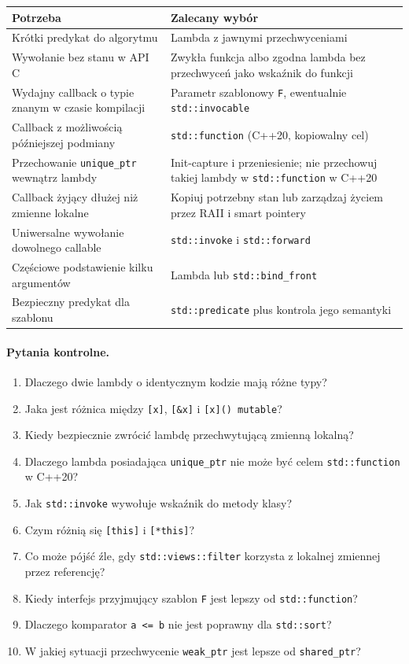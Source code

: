 \begin{center}
\begin{tabular}{|p{5.7cm}|p{6.6cm}|}
\hline
\textbf{Potrzeba} & \textbf{Zalecany wybór} \\
\hline
Krótki predykat do algorytmu & Lambda z jawnymi przechwyceniami \\
\hline
Wywołanie bez stanu w API C & Zwykła funkcja albo zgodna lambda bez przechwyceń jako wskaźnik do funkcji \\
\hline
Wydajny callback o typie znanym w czasie kompilacji & Parametr szablonowy \texttt{F}, ewentualnie \texttt{std::invocable} \\
\hline
Callback z możliwością późniejszej podmiany & \texttt{std::function} (C++20, kopiowalny cel) \\
\hline
Przechowanie \texttt{unique\_ptr} wewnątrz lambdy & Init-capture i przeniesienie; nie przechowuj takiej lambdy w \texttt{std::function} w C++20 \\
\hline
Callback żyjący dłużej niż zmienne lokalne & Kopiuj potrzebny stan lub zarządzaj życiem przez RAII i smart pointery \\
\hline
Uniwersalne wywołanie dowolnego callable & \texttt{std::invoke} i \texttt{std::forward} \\
\hline
Częściowe podstawienie kilku argumentów & Lambda lub \texttt{std::bind\_front} \\
\hline
Bezpieczny predykat dla szablonu & \texttt{std::predicate} plus kontrola jego semantyki \\
\hline
\end{tabular}
\end{center}

\paragraph{Pytania kontrolne.}
\begin{enumerate}
\item Dlaczego dwie lambdy o identycznym kodzie mają różne typy?
\item Jaka jest różnica między \texttt{[x]}, \texttt{[\&x]} i \texttt{[x]() mutable}?
\item Kiedy bezpiecznie zwrócić lambdę przechwytującą zmienną lokalną?
\item Dlaczego lambda posiadająca \texttt{unique\_ptr} nie może być celem \texttt{std::function} w C++20?
\item Jak \texttt{std::invoke} wywołuje wskaźnik do metody klasy?
\item Czym różnią się \texttt{[this]} i \texttt{[*this]}?
\item Co może pójść źle, gdy \texttt{std::views::filter} korzysta z lokalnej zmiennej przez referencję?
\item Kiedy interfejs przyjmujący szablon \texttt{F} jest lepszy od \texttt{std::function}?
\item Dlaczego komparator \texttt{a <= b} nie jest poprawny dla \texttt{std::sort}?
\item W jakiej sytuacji przechwycenie \texttt{weak\_ptr} jest lepsze od \texttt{shared\_ptr}?
\end{enumerate}

